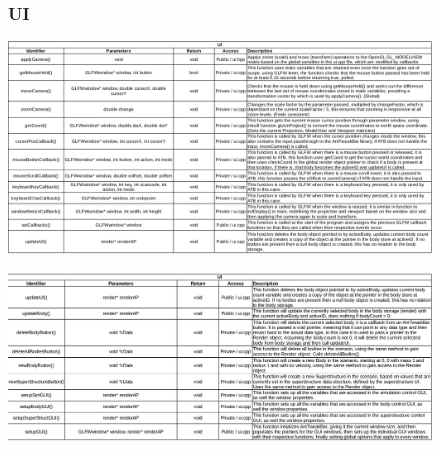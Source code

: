 \begin{figure}
  \subsubsection{UI}
  \centering  
  \includegraphics[width=\textwidth]{img/functions/ui.png}
\end{figure}

\begin{figure}
  \centering  
  \includegraphics[width=\textwidth]{img/functions/ui2.png}
\end{figure}